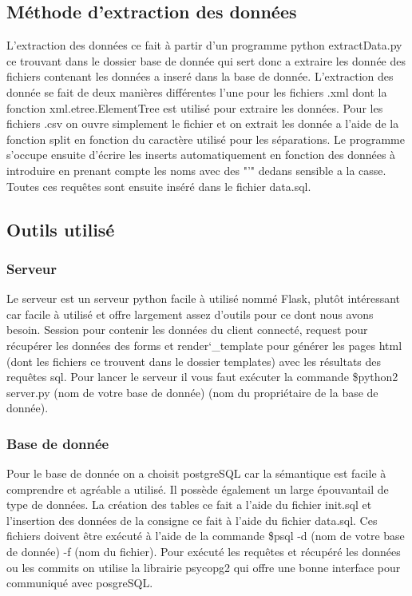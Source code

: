 \documentclass{article}
\begin{document}
\subsection{Méthode d'extraction des données}
L'extraction des données ce fait à partir d'un programme python extractData.py ce trouvant dans le dossier base de donnée qui sert donc a extraire les donnée des fichiers contenant les données a inseré dans la base de donnée. L'extraction des donnée se fait de deux manières différentes l'une pour les fichiers .xml dont la fonction xml.etree.ElementTree est utilisé pour extraire les données. Pour les fichiers .csv on ouvre simplement le fichier et on extrait les donnée a l'aide de la fonction split en fonction du caractère utilisé pour les séparations. Le programme s'occupe ensuite d'écrire les inserts automatiquement en fonction des données à introduire en prenant compte les noms avec des "'" dedans sensible a la casse. Toutes ces requêtes sont ensuite inséré dans le fichier data.sql.

\subsection{Outils utilisé}
\subsubsection*{Serveur}
Le serveur est un serveur python facile à utilisé nommé Flask, plutôt intéressant car facile à utilisé et offre largement assez d'outils pour ce dont nous avons besoin. Session pour contenir les données du client connecté, request pour récupérer les données des forms et render\char`_template pour générer les pages html (dont les fichiers ce trouvent dans le dossier templates) avec les résultats des requêtes sql. Pour lancer le serveur il vous faut exécuter la commande \$python2 server.py (nom de votre base de donnée) (nom du propriétaire de la base de donnée).

\subsubsection*{Base de donnée}
Pour le base de donnée on a choisit postgreSQL car la sémantique est facile à comprendre et agréable a utilisé. Il possède également un large épouvantail de type de données. La création des tables ce fait a l'aide du fichier init.sql et l'insertion des données de la consigne ce fait à l'aide du fichier data.sql. Ces fichiers doivent être exécuté à l'aide de la commande \$psql -d (nom de votre base de donnée) -f (nom du fichier). Pour exécuté les requêtes et récupéré les données ou les commits on utilise la librairie psycopg2 qui offre une bonne interface pour communiqué avec posgreSQL. 
\end{document}
